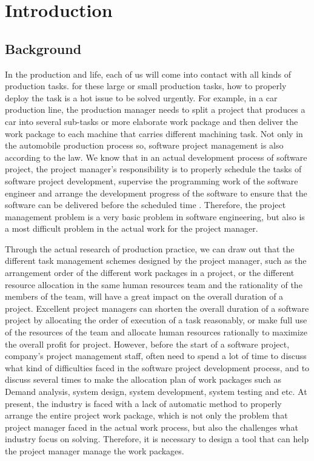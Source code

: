 
\section{Introduction}

\subsection{Background}
In the production and life, each of us will come into contact with all kinds of
production tasks. for these large or small production tasks, how to properly
deploy the task is a hot issue to be solved urgently. For example, in a car
production line, the production manager needs to split a project that produces a
car into several sub-tasks or more elaborate work package and then deliver the
work package to each machine that carries different machining task. Not only in
the automobile production process so, software project management is also
according to the law. We know that in an actual development process of software
project, the project manager's responsibility is to properly schedule the tasks
of software project development, supervise the programming work of the software
engineer and arrange the development progress of the software to ensure that the
software can be delivered before the scheduled time \cite{stellman}. Therefore,
the project management problem is a very basic problem in software engineering,
but also is a most difficult problem in the actual work for the project manager.


Through the actual research of production practice, we can draw out that the
different task management schemes designed by the project manager, such as the
arrangement order of the different work packages in a project, or the different
resource allocation in the same human resources team and the rationality of the
members of the team, will have a great impact on the overall duration of a
project. Excellent project managers can shorten the overall duration of a
software project by allocating the order of execution of a task reasonably, or
make full use of the resources of the team and allocate human resources
rationally to maximize the overall profit for project. However, before the start
of a software project, company's project management staff, often need to spend a
lot of time to discuss what kind of difficulties faced in the software project
development process, and to discuss several times to make the allocation plan of
work packages such as Demand analysis, system design, system development, system
testing and etc.  At present, the industry is faced with a lack of automatic
method to properly arrange the entire project work package, which is not only
the problem that project manager faced in the actual work process, but also the
challenges what industry focus on solving. Therefore, it is necessary to design
a tool that can help the project manager manage the work packages.


